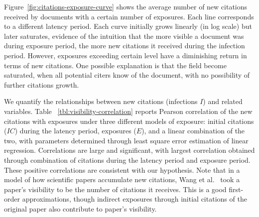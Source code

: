 \documentclass[10pt]{bmc_article}
\newenvironment{bmcformat}{\baselineskip20pt\sloppy\setboolean{publ}{false}}{\baselineskip20pt\sloppy}
\begin{document}
\begin{bmcformat}
\begin{table} [!t]
  \caption{Correlation of new citations, that are infections ($I$) with the number of exposures received. We report results for three different models of exposure: initial citations ($IC$), citations during the exposure period ($E_C$), or a linear combination of the two, with parameters obtained via linear regression analysis. %
  All correlations are statistically significant ($p<0.001$).}\label{tbl:visibility-correlation}
\end{table}

Figure~\ref{fig:citations-exposure-curve} shows the average number of new citations received by documents with a certain number of exposures. Each line corresponds to a different latency period. Each curve initially grows linearly (in log scale) but later saturates, evidence of the intuition that the more visible a document was during exposure period, the more new citations it received during the infection period.  However, exposures exceeding certain level have a diminishing return in terms of new citations. One possible explanation is that the field become saturated, when all potential citers know of the document, with no possibility of further citations growth.

We quantify the relationships between new citations (infections $I$) and related variables. Table ~\ref{tbl:visibility-correlation} reports Pearson correlation of the new citations with exposures under three different models of exposure: initial citations ($IC$) during the latency period, exposures ($E$), %
and a linear combination of the two, with parameters determined through least square error estimation of linear regression. Correlations are large and significant, with largest correlation obtained through combination of citations during the latency period and exposure period. These positive correlations are consistent with our hypothesis. Note that in a model of how scientific papers accumulate new citations, Wang et al.~\cite{Barabasi13} took a paper's visibility to be the number of citations it receives. This is a good first-order approximations, though indirect exposures through initial citations of the original paper %
also contribute to paper's visibility.


\end{bmcformat}
\end{document}
